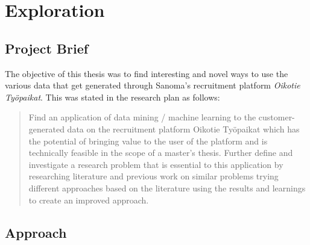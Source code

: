 
\clearpage

\section{Exploration}
\label{sec:Exploration}

\subsection{Project Brief}
\label{sub:Project Brief}

The objective of this thesis was to find interesting and novel ways to use the various data that get generated through Sanoma's  recruitment platform \emph{Oikotie Työpaikat}. This was stated in the research plan as follows:

\blockquote{Find an application of data mining / machine learning to the customer-generated data on the recruitment platform Oikotie Työpaikat which has the potential of bringing value to the user of the platform and is technically feasible in the scope of a master’s thesis. Further define and investigate a research problem that is essential to this application by researching literature and previous work on similar problems trying different approaches based on the literature using the results and learnings to create an improved approach.}






\subsection{Approach}
\label{sub:Approach}

